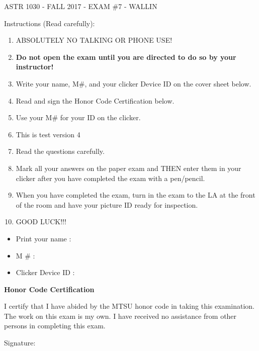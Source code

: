 \documentclass[11pt]{article}
\begin{document}
\pagebreak 
\setcounter{page}{1}
\vskip 0.1in 

\begin{center}ASTR 1030 - FALL 2017 - EXAM \#7 - WALLIN
\vskip 0.1in 

\end{center}
Instructions (Read carefully): 
\begin{enumerate}
\item ABSOLUTELY NO TALKING OR PHONE USE! 
\item {\bf Do not open the exam until you are directed to do so by your instructor!}
\item Write your name, M\#, and your clicker Device ID on the cover sheet below. 
\item Read and sign the Honor Code Certification below.
\item Use your M\# for your ID on the clicker.
\item This is test version 4
\item Read the questions carefully. 
\item Mark all your answers on the paper exam and THEN enter them in your clicker after you have completed the exam with a pen/pencil.
\item When you have completed the exam, turn in the exam to the LA at the front of the room and have your picture ID ready for inspection.
\item GOOD LUCK!!! 
\end{enumerate}
\hrulefill 
\vskip 0.1in 

\begin{itemize} \item Print your name :
\vskip 0.25in 


\item M \# :
\vskip 0.25in 

\item Clicker Device ID : 
\end{itemize} 
\vskip 0.5in 

{\bf Honor Code Certification}
\bigskip

I certify that I have abided by the MTSU honor code in taking this examination. The work
on this exam is my own. I have received no assistance from other persons in completing
this exam. 
\bigskip

Signature:


\pagebreak 
\end{document}
